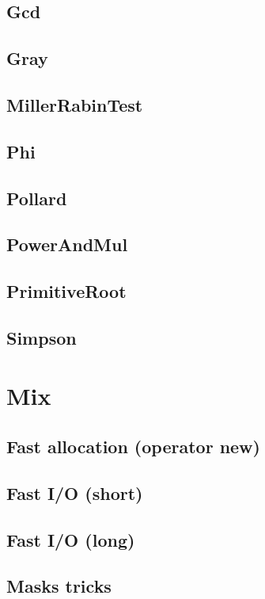 \subsection{Gcd}

\subsection{Gray}

\subsection{MillerRabinTest}

\subsection{Phi}

\subsection{Pollard}

\subsection{PowerAndMul}

\subsection{PrimitiveRoot}

\subsection{Simpson}



\section{Mix}

\subsection{Fast allocation (operator new)}
\subsection{Fast I/O (short)}
\subsection{Fast I/O (long)}
\subsection{Masks tricks}

